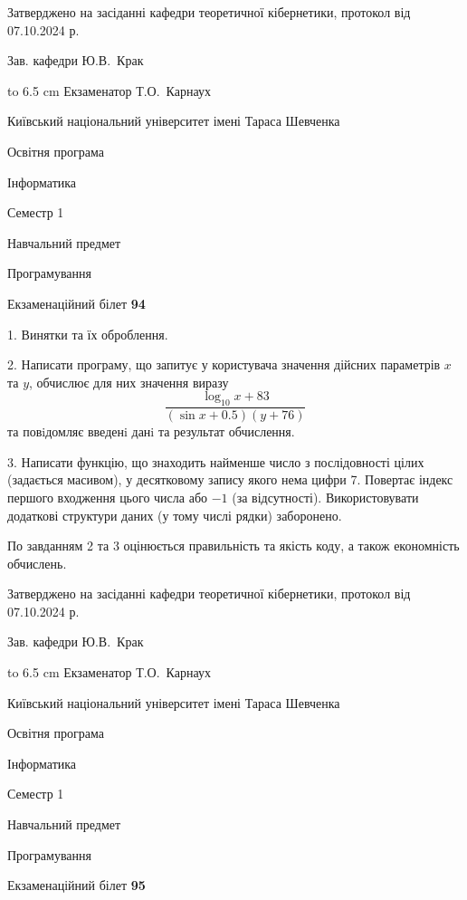 \documentclass[12pt, ukrainian]{article}
\begin{document}
{\smallskip\smallskip \begin {scriptsize} Затверджено на засіданні кафедри теоретичної кібернетики, протокол   від   07.10.2024 р.\par\smallskip\smallskip\smallskip\smallskip
{\parbox {6.5 cm} {Зав. кафедри \dotfill Ю.В.~Крак}}\hspace {0.7cm} {\hbox to 6.5 cm { Екзаменатор \dotfill Т.О.~Карнаух}} \end{scriptsize}}
\newpage
{{\begin {scriptsize}\par
{ \center  Київський національний університет імені Тараса Шевченка \par}
{\parbox {5 cm}{Освітня програма \hfill}{\parbox {7 cm}{Інформатика\hfill}}\parbox {6 cm}{\hfill Семестр 1}}\par
{\parbox {5 cm} {Навчальний предмет \hfill}\parbox {7 cm}{Програмування \hfill}\parbox {6cm}{\hfill}\par}\vspace{-15pt} \end{scriptsize}}{\center Екзаменаційний білет \No \textbf { 94 }\par}}
{%
1. Винятки та їх оброблення.%
\par
2. Написати програму, що запитує у користувача значення дійсних параметрів $x$ та $y$, обчислює для них значення виразу 
$$\frac{\log_{10} x + 83}{(\sin x + 0.5) (y + 76)}$$ 
та повiдомляє введенi данi та результат обчислення.

\par
3. Написати функцію, що знаходить найменше число з послідовності цілих (задається масивом), у десятковому запису якого нема цифри 7. Повертає індекс першого входження цього числа або $-1$ (за відсутності). Використовувати додаткові структури даних (у тому числі рядки) заборонено.

По завданням 2 та 3 оцінюється правильність та якість коду, а також економність обчислень.

}
{\smallskip\smallskip \begin {scriptsize} Затверджено на засіданні кафедри теоретичної кібернетики, протокол   від   07.10.2024 р.\par\smallskip\smallskip\smallskip\smallskip
{\parbox {6.5 cm} {Зав. кафедри \dotfill Ю.В.~Крак}}\hspace {0.7cm} {\hbox to 6.5 cm { Екзаменатор \dotfill Т.О.~Карнаух}} \end{scriptsize}}
\vspace{0.9cm}
{{\begin {scriptsize}\par
{ \center  Київський національний університет імені Тараса Шевченка \par}
{\parbox {5 cm}{Освітня програма \hfill}{\parbox {7 cm}{Інформатика\hfill}}\parbox {6 cm}{\hfill Семестр 1}}\par
{\parbox {5 cm} {Навчальний предмет \hfill}\parbox {7 cm}{Програмування \hfill}\parbox {6cm}{\hfill}\par}\vspace{-15pt} \end{scriptsize}}{\center Екзаменаційний білет \No \textbf { 95 }\par}}
\end{document}
